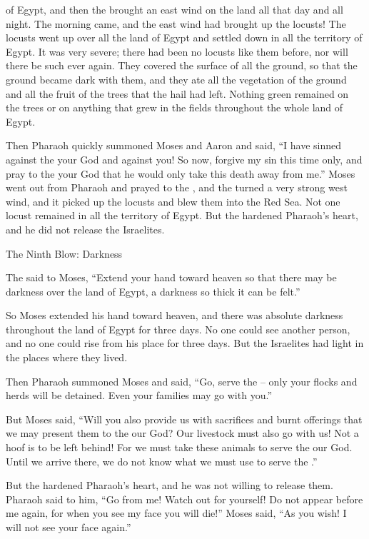 {of Egypt,
and then the
{}
brought
an east
wind
on the land
all
that day
and all
night.
The morning
came,
and the east
wind
had brought up
the
locusts!
The locusts
went up
over
all
the land
of Egypt
and settled
down in all
the territory
of Egypt.
It was very
severe;
there had been no
locusts
like
them
before,
nor
will there be
such ever again.
They covered
the surface
of all
the ground,
so that the ground
became dark
with them, and they ate
all
the vegetation
of the ground
and all
the fruit
of the trees
that
the hail
had left.
Nothing
green
remained
on the trees
or on anything that grew
in the fields
throughout the whole
land
of Egypt.
\par }{\PP Then Pharaoh
quickly
summoned
Moses
and Aaron
and said,
“I have sinned
against the
{}
your God and against you!
So now,
forgive
my sin
this time
only,
and pray
to the
{}
your God
that he would
only
take this
death away from me.”
Moses went out
from Pharaoh
and prayed
to
the {},
and the
{}
turned
a very
strong
west
wind,
and it picked
up the locusts
and blew
them into the Red
Sea.
Not
one
locust
remained
in all
the territory
of Egypt.
But
the {}
hardened
Pharaoh’s
heart,
and he did not
release
the Israelites.
\par }{\SH The Ninth Blow: Darkness
\par }{\PP {}The
{}
said
to
Moses,
“Extend
your hand
toward heaven
so that there may be
darkness
over
the land
of Egypt,
a darkness
so thick it can be felt.”
\par }{\PP {}So Moses
extended
his hand
toward heaven,
and there was
absolute
darkness
throughout
the land
of Egypt
for three
days.
No
one could see
another
person,
and no
one
could rise
from his place
for three
days.
But the Israelites
had light
in the places where they lived.
\par }{\PP {}Then Pharaoh
summoned
Moses
and said,
“Go,
serve
the {} –
only
your flocks
and herds
will be detained.
Even
your families
may go
with you.”
\par }{\PP {}But Moses
said,
“Will you
also
provide us
with sacrifices
and burnt offerings
that we may
present them to the
{}
our God?
Our livestock
must also
go
with
us! Not
a hoof
is to be left
behind! For we
must take
these animals to serve
the {}
our God.
Until
we arrive
there,
we
do not
know
what
we must use to serve
the {}.”
\par }{\PP {}But
the {}
hardened
Pharaoh’s
heart,
and he was not
willing
to release them.
Pharaoh
said
to him, “Go
from me! Watch
out for yourself! Do not
appear
before
me again,
for
when
you see
my face
you will die!”
Moses
said,
“As you wish! I will not
see
your face
again.”


}
